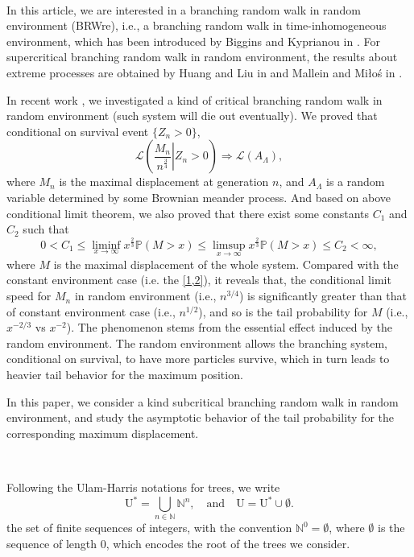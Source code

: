 \documentclass[]{article}
\numberwithin{equation}{section}
\theoremstyle{thmstyleone}%
\theoremstyle{thmstyletwo}%
\theoremstyle{thmstylethree}%
\theoremstyle{thmstylefour}%
\theoremstyle{thmstylefive}%
\theoremstyle{thmstylesix}%
\newcommand{\N}{\mathbb{N}}
\renewcommand{\P}{\mathbb{P}}
\begin{document}
	\
	
	In this article, we are interested in a branching random walk in random environment (BRWre), i.e., a branching random walk in time-inhomogeneous environment, which has been introduced by Biggins and Kyprianou in \cite{Biggins2004}.
	For supercritical branching random walk in random environment, the results about extreme processes are obtained by Huang and Liu in \cite{Huang2014} and Mallein and Mi\l o\'s in \cite{Mallein2019}.
	
	In recent work \cite{Fu2026}, we investigated a kind of critical branching random walk in random environment (such system will die out eventually). We proved that
	conditional on survival event $\{Z_n>0\}$, 
	\begin{equation}\label{4}
		\mathcal{L}\left(\left.\frac{M_n}{n^{\frac{3}{4}}}\right|Z_n>0\right) \Longrightarrow \mathcal{L}\left(A_{\Lambda}\right),
	\end{equation}
	where $M_n$ is the maximal displacement at generation $n$, and $A_\Lambda$ is a random variable determined by some Brownian meander process. And based on above conditional limit theorem, we also proved that there exist some constants $C_1$ and $C_2$ such that
	\begin{equation}\label{5}
		0< C_1
		\leqslant \liminf\limits_{x\rightarrow\infty} x^{\frac{2}{3}}\P(M>x)
		\leqslant \limsup\limits_{x\rightarrow\infty} x^{\frac{2}{3}}\P(M>x) \leqslant C_2<\infty,
	\end{equation}
	where $M$ is the maximal displacement of the whole system. 
	Compared with the constant environment case (i.e. the \cref{1,2}), 
	it reveals that, the conditional limit speed for $M_n$ in random environment (i.e., $n^{3/4}$) is significantly greater than that of constant environment case (i.e., $n^{1/2}$), and so is the tail probability for $M$ (i.e., $x^{-2/3}$ vs $x^{-2}$).
	The phenomenon stems from the essential effect induced by the random environment. The random environment allows the branching system, conditional on survival, to have more particles survive, which in turn leads to heavier tail behavior for the maximum position.
	
	
	In this paper, we consider a kind subcritical branching random walk in random environment, and study the asymptotic behavior of the tail probability for the corresponding maximum displacement.
	
	\
	
	Following the Ulam-Harris notations for trees, we write
	\begin{equation*}
		\mathrm{U}^*= \bigcup\limits_{n\in \N} \mathbb{N}^n, \quad\text{and}\quad
		\mathrm{U} = \mathrm{U}^*\cup \emptyset.
	\end{equation*}
	the set of finite sequences of integers, with the convention $\mathbb{N}^0 = \emptyset$, where $\emptyset$ is the
	sequence of length 0, which encodes the root of the trees we consider.
	
\end{document}
